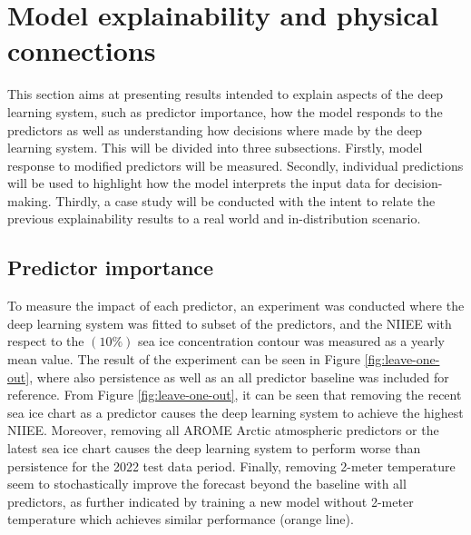 \documentclass[../main/thesis.tex]{subfiles}
\begin{document}
\section{Model explainability and physical connections}
\label{sec:physical-connections}
This section aims at presenting results intended to explain aspects of the deep learning system, such as predictor importance, how the model responds to the predictors as well as understanding how decisions where made by the deep learning system. This will be divided into three subsections. Firstly, model response to modified predictors will be measured. Secondly, individual predictions will be used to highlight how the model interprets the input data for decision-making. Thirdly, a case study will be conducted with the intent to relate the previous explainability results to a real world and in-distribution scenario.

\subsection{Predictor importance}
\label{sec:predictor-importance}
To measure the impact of each predictor, an experiment was conducted where the deep learning system was fitted to subset of the predictors, and the NIIEE with respect to the $(10\%)$ sea ice concentration contour was measured as a yearly mean value. The result of the experiment can be seen in Figure \ref{fig:leave-one-out}, where also persistence as well as an all predictor baseline was included for reference. From Figure \ref{fig:leave-one-out}, it can be seen that removing the recent sea ice chart as a predictor causes the deep learning system to achieve the highest NIIEE. Moreover, removing all AROME Arctic atmospheric predictors or the latest sea ice chart causes the deep learning system to perform worse than persistence for the 2022 test data period. Finally, removing 2-meter temperature seem to stochastically improve the forecast beyond the baseline with all predictors, as further indicated by training a new model without 2-meter temperature which achieves similar performance (orange line). 
\end{document}
